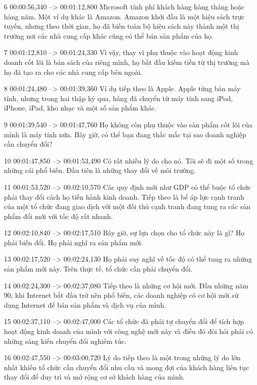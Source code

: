 6
00:00:56,340 --> 00:01:12,800
Microsoft tính phí khách hàng hàng tháng hoặc hàng năm.  Một ví dụ khác là Amazon.  Amazon khởi đầu là một hiệu sách trực tuyến, nhưng theo thời gian, họ đã biến toàn bộ hiệu sách này thành một thị trường nơi các nhà cung cấp khác cũng có thể bán sản phẩm của họ.

7
00:01:12,810 --> 00:01:24,330
Vì vậy, thay vì phụ thuộc vào hoạt động kinh doanh cốt lõi là bán sách của riêng mình, họ bắt đầu kiếm tiền từ thị trường mà họ đã tạo ra cho các nhà cung cấp bên ngoài.

8
00:01:24,480 --> 00:01:39,360
Ví dụ tiếp theo là Apple.  Apple từng bán máy tính, nhưng trong hai thập kỷ qua, hãng đã chuyển từ máy tính sang iPod, iPhone, iPad, kho nhạc và một số sản phẩm khác.

9
00:01:39,540 --> 00:01:47,760
Họ không còn phụ thuộc vào sản phẩm cốt lõi của mình là máy tính nữa.  Bây giờ, có thể bạn đang thắc mắc tại sao doanh nghiệp cần chuyển đổi?

10
00:01:47,850 --> 00:01:53,490
Có rất nhiều lý do cho nó.  Tôi sẽ đi một số trong những cái phổ biến.  Đầu tiên là những thay đổi về môi trường.

11
00:01:53,520 --> 00:02:10,570
Các quy định mới như GDP có thể buộc tổ chức phải thay đổi cách họ tiến hành kinh doanh.  Tiếp theo là bể áp lực cạnh tranh của một tổ chức đang giao dịch với một đối thủ cạnh tranh đang tung ra các sản phẩm đổi mới với tốc độ rất nhanh.

12
00:02:10,840 --> 00:02:17,510
Bây giờ, sự lựa chọn cho tổ chức này là gì?  Họ phải biến đổi.  Họ phải nghĩ ra sản phẩm mới.

13
00:02:17,520 --> 00:02:24,130
Họ phải suy nghĩ về tốc độ có thể tung ra những sản phẩm mới này.  Trên thực tế, tổ chức cần phải chuyển đổi.

14
00:02:24,300 --> 00:02:37,080
Tiếp theo là những cơ hội mới.  Đầu những năm 90, khi Internet bắt đầu trở nên phổ biến, các doanh nghiệp có cơ hội mới sử dụng Internet để bán sản phẩm và dịch vụ của mình.

15
00:02:37,110 --> 00:02:47,000
Các tổ chức đã phải tự chuyển đổi để tích hợp hoạt động kinh doanh của mình với công nghệ mới này và điều đó đòi hỏi phải có những sáng kiến ​​chuyển đổi nghiêm túc.

16
00:02:47,550 --> 00:03:00,720
Lý do tiếp theo là một trong những lý do lớn nhất khiến tổ chức cần chuyển đổi nhu cầu và mong đợi của khách hàng liên tục thay đổi để duy trì và mở rộng cơ sở khách hàng của mình.

